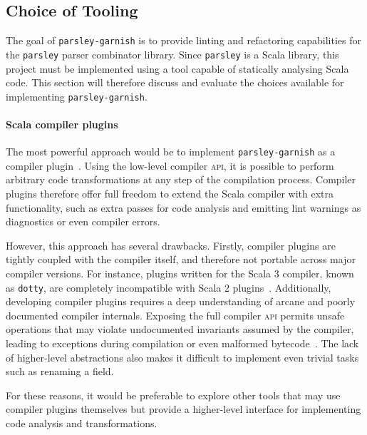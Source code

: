\documentclass[../../main.tex]{subfiles}
\begin{document}
\subsection{Choice of Tooling}
The goal of \texttt{parsley-garnish} is to provide linting and refactoring capabilities for the \texttt{parsley} parser combinator library.
Since \texttt{parsley} is a Scala library, this project must be implemented using a tool capable of statically analysing Scala code.
This section will therefore discuss and evaluate the choices available for implementing \texttt{parsley-garnish}.

\paragraph{Scala compiler plugins}
The most powerful approach would be to implement \texttt{parsley-garnish} as a compiler plugin~\cite{pickering_plugins_2019}.
Using the low-level compiler \textsc{api}, it is possible to perform arbitrary code transformations at any step of the compilation process.
Compiler plugins therefore offer full freedom to extend the Scala compiler with extra functionality, such as extra passes for code analysis and emitting lint warnings as diagnostics or even compiler errors.

However, this approach has several drawbacks.
Firstly, compiler plugins are tightly coupled with the compiler itself, and therefore not portable across major compiler versions.
For instance, plugins written for the Scala 3 compiler, known as \texttt{dotty}, are completely incompatible with Scala 2 plugins~\cite{lampepfl_changes_2022}.
Additionally, developing compiler plugins requires a deep understanding of arcane and poorly documented compiler internals.
Exposing the full compiler \textsc{api} permits unsafe operations that may violate undocumented invariants assumed by the compiler, leading to exceptions during compilation or even malformed bytecode~\cite{sherwany_refactoring_2015}.
The lack of higher-level abstractions also makes it difficult to implement even trivial tasks such as renaming a field.

For these reasons, it would be preferable to explore other tools that may use compiler plugins themselves but provide a higher-level interface for implementing code analysis and transformations.
\end{document}
